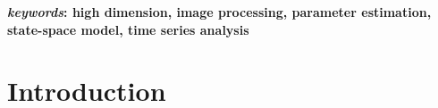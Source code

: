 \documentclass[fleqn,12pt]{article}
\begin{document}
%
%
%
%
%
%


\textbf{\emph{keywords}: high dimension, image processing, parameter estimation, state-space model, time series analysis}
%
%
%
\section{Introduction}
\end{document}
